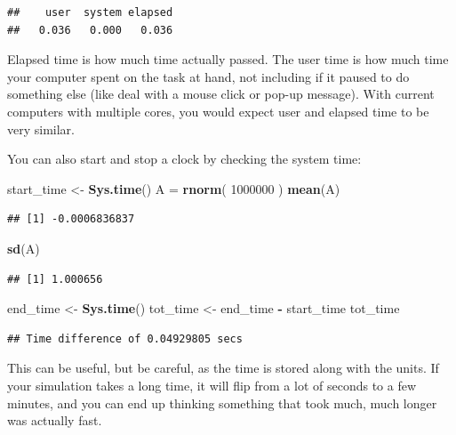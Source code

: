 \documentclass[
]{book}
\newenvironment{Shaded}{\begin{snugshade}}{\end{snugshade}}
\newcommand{\DecValTok}[1]{\textcolor[rgb]{0.00,0.00,0.81}{#1}}
\newcommand{\FunctionTok}[1]{\textcolor[rgb]{0.13,0.29,0.53}{\textbf{#1}}}
\newcommand{\NormalTok}[1]{#1}
\newcommand{\OtherTok}[1]{\textcolor[rgb]{0.56,0.35,0.01}{#1}}
\newcommand{\SpecialCharTok}[1]{\textcolor[rgb]{0.81,0.36,0.00}{\textbf{#1}}}
\begin{document}
\begin{verbatim}
##    user  system elapsed 
##   0.036   0.000   0.036
\end{verbatim}

Elapsed time is how much time actually passed.
The user time is how much time your computer spent on the task at hand, not including if it paused to do something else (like deal with a mouse click or pop-up message).
With current computers with multiple cores, you would expect user and elapsed time to be very similar.

You can also start and stop a clock by checking the system time:

\begin{Shaded}
\begin{Highlighting}[]
\NormalTok{start\_time }\OtherTok{\textless{}{-}} \FunctionTok{Sys.time}\NormalTok{()}
\NormalTok{A }\OtherTok{=} \FunctionTok{rnorm}\NormalTok{( }\DecValTok{1000000}\NormalTok{ )}
\FunctionTok{mean}\NormalTok{(A)}
\end{Highlighting}
\end{Shaded}

\begin{verbatim}
## [1] -0.0006836837
\end{verbatim}

\begin{Shaded}
\begin{Highlighting}[]
\FunctionTok{sd}\NormalTok{(A)}
\end{Highlighting}
\end{Shaded}

\begin{verbatim}
## [1] 1.000656
\end{verbatim}

\begin{Shaded}
\begin{Highlighting}[]
\NormalTok{end\_time }\OtherTok{\textless{}{-}} \FunctionTok{Sys.time}\NormalTok{()}
\NormalTok{tot\_time }\OtherTok{\textless{}{-}}\NormalTok{ end\_time }\SpecialCharTok{{-}}\NormalTok{ start\_time}
\NormalTok{tot\_time}
\end{Highlighting}
\end{Shaded}

\begin{verbatim}
## Time difference of 0.04929805 secs
\end{verbatim}

This can be useful, but be careful, as the time is stored along with the units. If your simulation takes a long time, it will flip from a lot of seconds to a few minutes, and you can end up thinking something that took much, much longer was actually fast.
\end{document}
